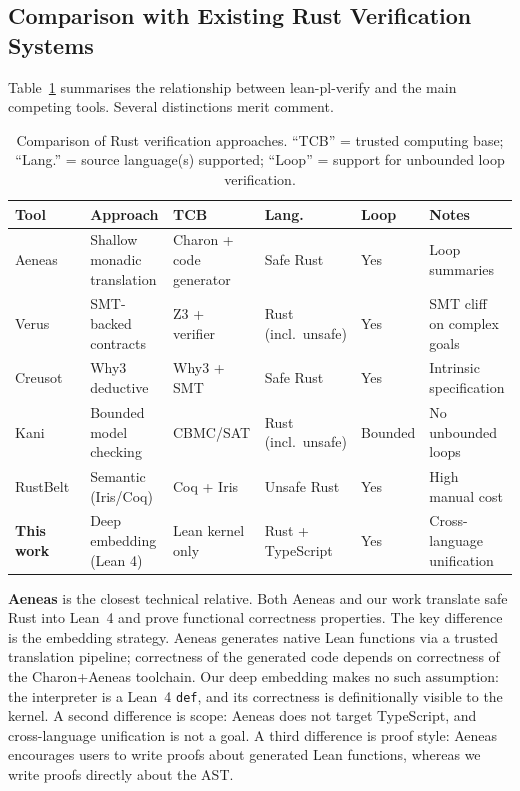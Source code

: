 \subsection{Comparison with Existing Rust Verification Systems}

Table~\ref{tab:comparison} summarises the relationship between lean-pl-verify
and the main competing tools. Several distinctions merit comment.

\begin{table}[t]
\centering
\caption{Comparison of Rust verification approaches.
         ``TCB'' = trusted computing base; ``Lang.'' = source language(s) supported;
         ``Loop'' = support for unbounded loop verification.}
\label{tab:comparison}
\small
\begin{tabular}{@{}llllll@{}}
\toprule
\textbf{Tool} & \textbf{Approach} & \textbf{TCB} & \textbf{Lang.} & \textbf{Loop} & \textbf{Notes} \\
\midrule
Aeneas~\cite{ho2022aeneas}   & Shallow monadic translation & Charon + code generator & Safe Rust & Yes & Loop summaries \\
Verus~\cite{verus2023}        & SMT-backed contracts & Z3 + verifier & Rust (incl.\ unsafe) & Yes & SMT cliff on complex goals \\
Creusot~\cite{creusot2022}   & Why3 deductive & Why3 + SMT & Safe Rust & Yes & Intrinsic specification \\
Kani~\cite{kani2022}         & Bounded model checking & CBMC/SAT & Rust (incl.\ unsafe) & Bounded & No unbounded loops \\
RustBelt~\cite{rustbelt2018} & Semantic (Iris/Coq) & Coq + Iris & Unsafe Rust & Yes & High manual cost \\
\midrule
\textbf{This work}            & Deep embedding (Lean 4) & Lean kernel only & Rust + TypeScript & Yes & Cross-language unification \\
\bottomrule
\end{tabular}
\end{table}

\textbf{Aeneas} is the closest technical relative. Both Aeneas and our work
translate safe Rust into Lean~4 and prove functional correctness properties.
The key difference is the embedding strategy. Aeneas generates native Lean
functions via a trusted translation pipeline; correctness of the generated code
depends on correctness of the Charon+Aeneas toolchain. Our deep embedding
makes no such assumption: the interpreter is a Lean~4 \texttt{def}, and its
correctness is definitionally visible to the kernel. A second difference is
scope: Aeneas does not target TypeScript, and cross-language unification is
not a goal. A third difference is proof style: Aeneas encourages users to
write proofs about generated Lean functions, whereas we write proofs directly
about the AST.

